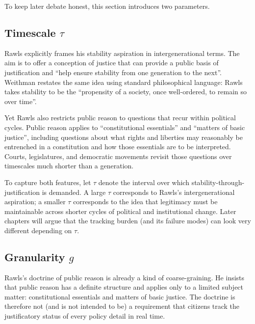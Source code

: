 \documentclass[12pt]{report}
\begin{document}
To keep later debate honest, this section introduces two parameters.

\subsection{Timescale \(\tau\)}\label{sec:tau}

Rawls explicitly frames his stability aspiration in intergenerational terms. The aim is to offer a conception of justice that can provide a public basis of justification and \enquote{help ensure stability from one generation to the next}.\parencite[p.~1]{rawls1987overlapping} Weithman restates the same idea using standard philosophical language: Rawls takes stability to be the \enquote{propensity of a society, once well-ordered, to remain so over time}.\parencite[p.~198]{Weithman2023FixedPoints}

Yet Rawls also restricts public reason to questions that recur within political cycles. Public reason applies to \enquote{constitutional essentials} and \enquote{matters of basic justice}, including questions about what rights and liberties may reasonably be entrenched in a constitution and how those essentials are to be interpreted.\parencite[p.~767]{rawls1997public} Courts, legislatures, and democratic movements revisit those questions over timescales much shorter than a generation.

To capture both features, let \(\tau\) denote the interval over which stability-through-justification is demanded. A large \(\tau\) corresponds to Rawls’s intergenerational aspiration; a smaller \(\tau\) corresponds to the idea that legitimacy must be maintainable across shorter cycles of political and institutional change. Later chapters will argue that the tracking burden (and its failure modes) can look very different depending on \(\tau\).

\subsection{Granularity \(g\)}\label{sec:g}

Rawls’s doctrine of public reason is already a kind of coarse-graining. He insists that public reason has a definite structure and applies only to a limited subject matter: constitutional essentials and matters of basic justice.\parencite[p.~767]{rawls1997public} The doctrine is therefore not (and is not intended to be) a requirement that citizens track the justificatory status of every policy detail in real time.
\end{document}
